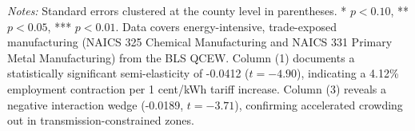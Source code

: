 \begin{table}[htbp]
\centering
\small
\caption{The Industrial Crowding-Out Effect: Impact of Power Tariff Shocks on Manufacturing}
\label{tab:table3_crowdout}
\begin{minipage}{\linewidth}
\vspace{1ex}
\footnotesize \textit{Notes:} Standard errors clustered at the county level in parentheses. * $p<0.10$, ** $p<0.05$, *** $p<0.01$. Data covers energy-intensive, trade-exposed manufacturing (NAICS 325 Chemical Manufacturing and NAICS 331 Primary Metal Manufacturing) from the BLS QCEW. Column (1) documents a statistically significant semi-elasticity of -0.0412 ($t = -4.90$), indicating a 4.12\% employment contraction per 1 cent/kWh tariff increase. Column (3) reveals a negative interaction wedge (-0.0189, $t = -3.71$), confirming accelerated crowding out in transmission-constrained zones.
\end{minipage}
\end{table}
